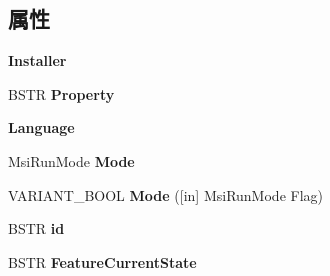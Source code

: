 \subsection*{属性}
\begin{DoxyCompactItemize}
\item 
\mbox{\label{interface_windows_installer_1_1_session_a571d3e23b460e8f05ef029ad827fcbc2}} 
{\bfseries Installer}
\item 
\mbox{\label{interface_windows_installer_1_1_session_a5779c455e82c381d61c3de77d31ff3fa}} 
B\+S\+TR {\bfseries Property}
\item 
\mbox{\label{interface_windows_installer_1_1_session_a752a65109c141f6b4a8ca17232b255ab}} 
{\bfseries Language}
\item 
\mbox{\label{interface_windows_installer_1_1_session_ab925c1310911d8d304780032c6e6d4dd}} 
Msi\+Run\+Mode {\bfseries Mode}
\item 
\mbox{\label{interface_windows_installer_1_1_session_a8866c0344b43b21065eced6b440ab278}} 
V\+A\+R\+I\+A\+N\+T\+\_\+\+B\+O\+OL {\bfseries Mode} (\mbox{[}in\mbox{]} Msi\+Run\+Mode Flag)
\item 
\mbox{\label{interface_windows_installer_1_1_session_a5392dd0806c8bb499c99596a5095dc59}} 
B\+S\+TR {\bfseries id}
\item 
\mbox{\label{interface_windows_installer_1_1_session_a995a9d165f881b3171b6a63d29cf6ee5}} 
B\+S\+TR {\bfseries Feature\+Current\+State}

\end{DoxyCompactItemize}
